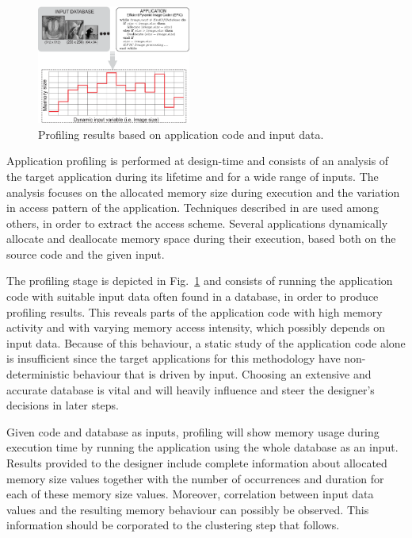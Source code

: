 \documentclass[a4paper,conference]{IEEEtran}
\begin{document}
\begin{figure}[!t]
\centering
\includegraphics[width=0.45\textwidth]{Images/profiling2.eps}
\caption{Profiling results based on application code and input data.}
\label{fig:profiling}
\end{figure}

Application profiling is performed at design-time and consists of an analysis of the target application during its lifetime and for a wide range of inputs. The analysis focuses on the allocated memory size during execution and the variation in access pattern of the application. Techniques described in \cite{Ang13b} are used among others, in order to extract the access scheme. Several applications dynamically allocate and deallocate memory space during their execution, based both on the source code and the given input. 

The profiling stage is depicted in Fig.~\ref{fig:profiling} and consists of running the application code with suitable input data often found in a database, in order to produce profiling results. This reveals parts of the application code with high memory activity and with varying memory access intensity, which possibly depends on input data. Because of this behaviour, a static study of the application code alone is insufficient since the target applications for this methodology have non-deterministic behaviour that is driven by input. Choosing an extensive and accurate database is vital and will heavily influence and steer the designer's decisions in later steps. 

Given code and database as inputs, profiling will show memory usage during execution time by running the application using the whole database as an input. Results provided to the designer include complete information about allocated memory size values together with the number of occurrences and duration for each of these memory size values. Moreover, correlation between input data values and the resulting memory behaviour can possibly be observed. This information should be corporated to the clustering step that follows. 
\end{document}
